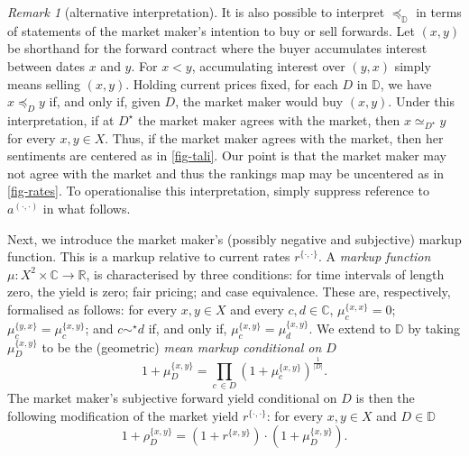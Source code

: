 \documentclass[ecta,nameyear,draft]{econsocart}
\newcommand{\R}{\mathbb R}
\newcommand{\mbbd}{{\mathds D}}
\newcommand{\mbbc}{{\mathds C}}
\newcommand{\past}{{D^\star}}
\newcommand{\xy}{{(x, y)}}
\newcommand{\dd}{{(\cdot,\cdot)}}
\theoremstyle{plain}
\theoremstyle{remark}
\newtheorem*{remark*}{Remark}
\begin{document}
\begin{remark*}[alternative interpretation] It is also possible to interpret
  $\preceq_\mbbd$ in terms of statements of the market maker's intention to buy
  or sell forwards. Let $(x, y)$ be shorthand for the forward contract where
  the buyer accumulates interest between dates $x$ and $y$. For $x < y$, 
  accumulating interest over $(y, x)$ simply means selling $(x, y)$.  Holding
  current prices fixed, for each $D$ in $ \mbbd$, we have $x \preceq_{D} y$ if,
  and only if, given $D$, the market maker would buy $(x, y)$. Under this
  interpretation, if at $\past$ the market maker agrees with the market, then
  $x \simeq_{\past} y$ for every $x, y \in X$. Thus, if the market maker agrees
  with the market, then her {sentiments} are centered as in \cref{fig-tali}.
  Our point is that the market maker may not agree with the market and thus the
  rankings map may be uncentered as in \cref{fig-rates}.  To operationalise
  this interpretation, simply suppress reference to $a^{\dd}$ in
  what follows.%
\end{remark*}

Next, we introduce the market maker's (possibly negative and subjective) markup
function. This is a markup relative to current rates $r^{\{\cdot, \cdot\}}$.  A
\emph{markup function} $\mu : X^2 \times \mbbc \rightarrow \R$, is
characterised by three conditions: for time intervals of length zero, the yield
is zero; fair pricing; and case equivalence.  These are, respectively,
formalised as follows: for every $x,y\in X$ and every $c , d\in \mbbc$,
$\mu^{\{x,x\}}_{c} = 0$; $\mu^{\{y,x\}}_{c} = \mu^{\{x,y\}}_{c}$; and $c
\sim^{\star} d$ if, and only if, $\mu^{\{x,y\}}_{c} = \mu^{\{x,y\}}_{d}$.  We
extend to $\mbbd$ by taking $\mu^{\{x, y\}}_{D}$ to be the (geometric)
\emph{mean markup conditional on $D$}
\begin{equation*} 1 + \mu^{\{x, y\}}_{D}
  = \prod_{c\,\in D} \left(1 + \mu^{\{x, y\}}_{c}\right)^{\frac{1}{\lvert D
  \rvert}}.
\end{equation*}
The market maker's subjective forward yield conditional on $D$ is then the
following modification of the market yield $r^{\{\cdot,\cdot\}}$: for every
$x,y\in X$ and $D \in \mbbd$
\begin{equation*}
  1 + \rho^{\{x,y\}}_{D} = \left(1 + r^{\{x,y\}}\right)\cdot\left(1 +
  \mu^{\{x,y\}}_{D}\right).
\end{equation*}
\end{document}
